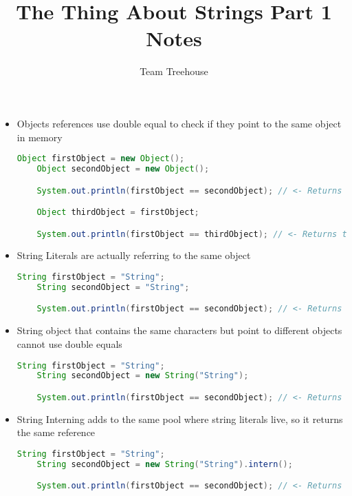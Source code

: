 \documentclass[12pt]{article}
\begin{document}
\title{The Thing About Strings Part 1 Notes}
\author{Team Treehouse}
\maketitle

\begin{itemize}
    \item Objects references use double equal to check if they point to the same
    object in memory

    \begin{lstlisting}[language=Java, caption={lesson\_01/Explore.java}]
    Object firstObject = new Object();
    Object secondObject = new Object();

    System.out.println(firstObject == secondObject); // <- Returns false

    Object thirdObject = firstObject;

    System.out.println(firstObject == thirdObject); // <- Returns true
    \end{lstlisting}

    \item String Literals are actually referring to the same object

    \begin{lstlisting}[language=Java]
    String firstObject = "String";
    String secondObject = "String";

    System.out.println(firstObject == secondObject); // <- Returns true
    \end{lstlisting}

    \item String object that contains the same characters but point to different
    objects cannot use double equals

    \begin{lstlisting}[language=Java]
    String firstObject = "String";
    String secondObject = new String("String");

    System.out.println(firstObject == secondObject); // <- Returns false
    \end{lstlisting}

    \item String Interning adds to the same pool where string literals live, so
    it returns the same reference

    \begin{lstlisting}[language=Java]
    String firstObject = "String";
    String secondObject = new String("String").intern();

    System.out.println(firstObject == secondObject); // <- Returns true
    \end{lstlisting}
\end{itemize}
\end{document}
